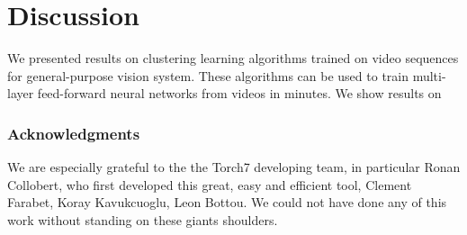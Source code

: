 \documentclass{article} %
\begin{document}
\section{Discussion}

We presented results on clustering learning algorithms trained on video sequences for general-purpose vision system. These algorithms can be used to train multi-layer feed-forward neural networks from videos in minutes. We show results on 



%


\subsubsection*{Acknowledgments}
We are especially grateful to the the Torch7 developing team, in particular Ronan Collobert, who first developed this great, easy and efficient tool, Clement Farabet, Koray Kavukcuoglu, Leon Bottou. We could not have done any of this work without standing on these giants shoulders.



\end{document}
